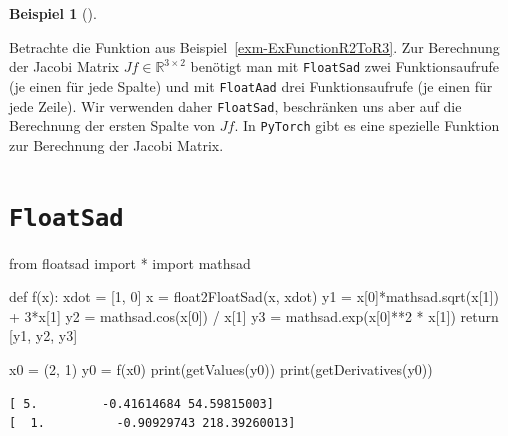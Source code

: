 \documentclass[
  a4paper,
  DIV=11]{scrreprt}
\newenvironment{Shaded}{\begin{snugshade}}{\end{snugshade}}
\newcommand{\BuiltInTok}[1]{\textcolor[rgb]{0.00,0.23,0.31}{#1}}
\newcommand{\ControlFlowTok}[1]{\textcolor[rgb]{0.00,0.23,0.31}{#1}}
\newcommand{\DecValTok}[1]{\textcolor[rgb]{0.68,0.00,0.00}{#1}}
\newcommand{\ImportTok}[1]{\textcolor[rgb]{0.00,0.46,0.62}{#1}}
\newcommand{\KeywordTok}[1]{\textcolor[rgb]{0.00,0.23,0.31}{#1}}
\newcommand{\NormalTok}[1]{\textcolor[rgb]{0.00,0.23,0.31}{#1}}
\newcommand{\OperatorTok}[1]{\textcolor[rgb]{0.37,0.37,0.37}{#1}}
\theoremstyle{definition}
\theoremstyle{definition}
\newtheorem{example}{Beispiel}[chapter]
\theoremstyle{remark}
\begin{document}
\begin{example}[]\protect\hypertarget{exm-JacobianAutogradVsFloatSad}{}\label{exm-JacobianAutogradVsFloatSad}

Betrachte die Funktion aus Beispiel~\ref{exm-ExFunctionR2ToR3}. Zur
Berechnung der Jacobi Matrix \(Jf \in \mathbb{R}^{3\times 2}\) benötigt
man mit \texttt{FloatSad} zwei Funktionsaufrufe (je einen für jede
Spalte) und mit \texttt{FloatAad} drei Funktionsaufrufe (je einen für
jede Zeile). Wir verwenden daher \texttt{FloatSad}, beschränken uns aber
auf die Berechnung der ersten Spalte von \(Jf\). In \texttt{PyTorch}
gibt es eine spezielle Funktion zur Berechnung der Jacobi Matrix.

\section{\texorpdfstring{\texttt{FloatSad}}{FloatSad}}

\begin{Shaded}
\begin{Highlighting}[]
\ImportTok{from}\NormalTok{ floatsad }\ImportTok{import} \OperatorTok{*}
\ImportTok{import}\NormalTok{ mathsad}

\KeywordTok{def}\NormalTok{ f(x):}
\NormalTok{    xdot }\OperatorTok{=}\NormalTok{ [}\DecValTok{1}\NormalTok{, }\DecValTok{0}\NormalTok{]}
\NormalTok{    x }\OperatorTok{=}\NormalTok{ float2FloatSad(x, xdot)}
\NormalTok{    y1 }\OperatorTok{=}\NormalTok{ x[}\DecValTok{0}\NormalTok{]}\OperatorTok{*}\NormalTok{mathsad.sqrt(x[}\DecValTok{1}\NormalTok{]) }\OperatorTok{+} \DecValTok{3}\OperatorTok{*}\NormalTok{x[}\DecValTok{1}\NormalTok{]}
\NormalTok{    y2 }\OperatorTok{=}\NormalTok{ mathsad.cos(x[}\DecValTok{0}\NormalTok{]) }\OperatorTok{/}\NormalTok{ x[}\DecValTok{1}\NormalTok{]}
\NormalTok{    y3 }\OperatorTok{=}\NormalTok{ mathsad.exp(x[}\DecValTok{0}\NormalTok{]}\OperatorTok{**}\DecValTok{2} \OperatorTok{*}\NormalTok{ x[}\DecValTok{1}\NormalTok{])}
    \ControlFlowTok{return}\NormalTok{ [y1, y2, y3]    }

\NormalTok{x0 }\OperatorTok{=}\NormalTok{ (}\DecValTok{2}\NormalTok{, }\DecValTok{1}\NormalTok{)}
\NormalTok{y0 }\OperatorTok{=}\NormalTok{ f(x0)}
\BuiltInTok{print}\NormalTok{(getValues(y0))}
\BuiltInTok{print}\NormalTok{(getDerivatives(y0))}
\end{Highlighting}
\end{Shaded}

\begin{verbatim}
[ 5.         -0.41614684 54.59815003]
[  1.          -0.90929743 218.39260013]
\end{verbatim}


\end{example}
\end{document}
